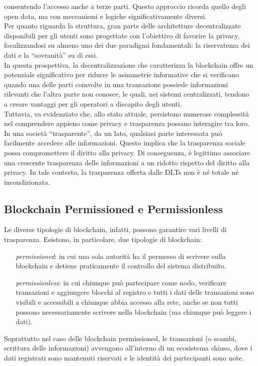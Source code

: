 consentendo l'accesso anche a terze parti. Questo approccio ricorda quello degli open data, ma con meccanismi e logiche significativamente diversi.
\\Per quanto riguarda la struttura, gran parte delle architetture decentralizzate disponibili per gli utenti sono progettate con l'obiettivo di favorire la privacy, focalizzandosi su almeno uno dei due paradigmi fondamentali: la riservatezza dei dati e la “sovranità” su di essi.
\\In questa prospettiva, la decentralizzazione che caratterizza la blockchain offre un potenziale significativo per ridurre le asimmetrie informative che si verificano quando una delle parti coinvolte in una transazione possiede informazioni rilevanti che l'altra parte non conosce, le quali, nei sistemi centralizzati, tendono a creare vantaggi per gli operatori a discapito degli utenti.
\\Tuttavia, va evidenziato che, allo stato attuale, persistono numerose complessità nel comprendere appieno come privacy e trasparenza possano interagire tra loro.
In una società “trasparente”, da un lato, qualsiasi parte interessata può facilmente accedere alle informazioni. Questo implica che la trasparenza sociale possa compromettere il diritto alla privacy. Di conseguenza, è legittimo associare una crescente trasparenza delle informazioni a un ridotto rispetto del diritto alla privacy.
In tale contesto, la trasparenza offerta dalle DLTs non è né totale né incondizionata. 
\subsection{Blockchain Permissioned e Permissionless}
Le diverse tipologie di blockchain, infatti, possono garantire vari livelli di trasparenza. Esistono, in particolare, due tipologie di blockchain: 
\begin{itemize}
    \item [\textit{permissioned}:] in cui una sola autorità ha il permesso di scrivere sulla blockchain e detiene praticamente il controllo del sistema distribuito.
    \item [\textit{permissionless}:] in cui chiunque può partecipare come nodo, verificare transazioni e aggiungere blocchi al registro e tutti i dati delle transazioni sono visibili e accessibili a chiunque abbia accesso alla rete, anche se non tutti possono necessariamente scrivere nella blockchain (ma chiunque può leggere i dati).
\end{itemize}
Soprattutto nel caso delle blockchain permissioned, le transazioni (o scambi, scrittura delle informazioni) avvengono all’interno di un ecosistema chiuso, dove i dati registrati sono mantenuti riservati e le identità dei partecipanti sono note.

